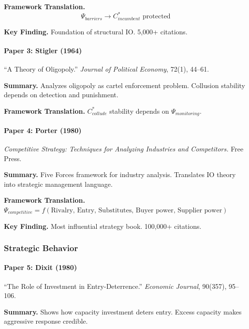 \textbf{Framework Translation.}
\begin{equation}
\Psi_{barriers} \to C^*_{incumbent} \text{ protected}
\end{equation}

\textbf{Key Finding.}
Foundation of structural IO. 5,000+ citations.

\paragraph{Paper 3: Stigler (1964)}

``A Theory of Oligopoly.''
\textit{Journal of Political Economy}, 72(1), 44--61.

\textbf{Summary.}
Analyzes oligopoly as cartel enforcement problem. Collusion stability 
depends on detection and punishment.

\textbf{Framework Translation.}
$C^*_{collude}$ stability depends on $\Psi_{monitoring}$.

\paragraph{Paper 4: Porter (1980)}

\textit{Competitive Strategy: Techniques for Analyzing Industries and Competitors.}
Free Press.

\textbf{Summary.}
Five Forces framework for industry analysis. Translates IO theory into 
strategic management language.

\textbf{Framework Translation.}
$\Psi_{competitive} = f(\text{Rivalry, Entry, Substitutes, Buyer power, Supplier power})$

\textbf{Key Finding.}
Most influential strategy book. 100,000+ citations.

\subsubsection{Strategic Behavior}

\paragraph{Paper 5: Dixit (1980)}

``The Role of Investment in Entry-Deterrence.''
\textit{Economic Journal}, 90(357), 95--106.

\textbf{Summary.}
Shows how capacity investment deters entry. Excess capacity makes aggressive 
response credible.

